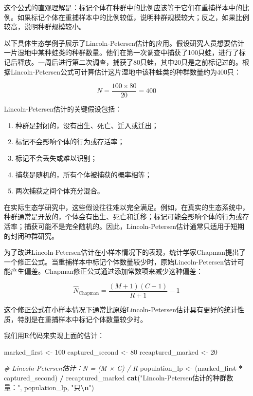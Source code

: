 \documentclass[
  twoside,12pt,fontset=none]{ctexbook}
\newenvironment{Shaded}{\begin{snugshade}}{\end{snugshade}}
\newcommand{\CommentTok}[1]{\textcolor[rgb]{0.56,0.35,0.01}{\textit{#1}}}
\newcommand{\DecValTok}[1]{\textcolor[rgb]{0.00,0.00,0.81}{#1}}
\newcommand{\FunctionTok}[1]{\textcolor[rgb]{0.13,0.29,0.53}{\textbf{#1}}}
\newcommand{\NormalTok}[1]{#1}
\newcommand{\OtherTok}[1]{\textcolor[rgb]{0.56,0.35,0.01}{#1}}
\newcommand{\SpecialCharTok}[1]{\textcolor[rgb]{0.81,0.36,0.00}{\textbf{#1}}}
\newcommand{\StringTok}[1]{\textcolor[rgb]{0.31,0.60,0.02}{#1}}
\providecommand{\tightlist}{%
  \setlength{\itemsep}{0pt}\setlength{\parskip}{0pt}}
\begin{document}
这个公式的直观理解是：标记个体在种群中的比例应该等于它们在重捕样本中的比例。如果标记个体在重捕样本中的比例较低，说明种群规模较大；反之，如果比例较高，说明种群规模较小。

以下具体生态学例子展示了Lincoln-Petersen估计的应用。假设研究人员想要估计一片湿地中某种蛙类的种群数量。他们在第一次调查中捕获了100只蛙，进行了标记后释放。一周后进行第二次调查，捕获了80只蛙，其中20只是之前标记过的。根据Lincoln-Petersen公式可计算估计这片湿地中该种蛙类的种群数量约为400只：

\[N = \frac{100 \times 80}{20} = 400\]

Lincoln-Petersen估计的关键假设包括：

\begin{enumerate}
\def\labelenumi{\arabic{enumi}.}
\tightlist
\item
  种群是封闭的，没有出生、死亡、迁入或迁出；
\item
  标记不会影响个体的行为或存活率；
\item
  标记不会丢失或难以识别；
\item
  捕获是随机的，所有个体被捕获的概率相等；
\item
  两次捕获之间个体充分混合。
\end{enumerate}

在实际生态学研究中，这些假设往往难以完全满足。例如，在真实的生态系统中，种群通常是开放的，个体会有出生、死亡和迁移；标记可能会影响个体的行为或存活率；捕获可能不是完全随机的。因此，Lincoln-Petersen估计通常只适用于短期的封闭种群研究。

为了改进Lincoln-Petersen估计在小样本情况下的表现，统计学家Chapman提出了一个修正公式。当重捕样本中标记个体数量较少时，原始Lincoln-Petersen估计可能产生偏差。Chapman修正公式通过添加常数项来减少这种偏差：

\[\hat{N}_{\text{Chapman}} = \frac{(M+1)(C+1)}{R+1} - 1\]

这个修正公式在小样本情况下通常比原始Lincoln-Petersen估计具有更好的统计性质，特别是在重捕样本中标记个体数量较少时。

我们用R代码来实现上面的估计：

\begin{Shaded}
\begin{Highlighting}[]
\NormalTok{marked\_first }\OtherTok{\textless{}{-}} \DecValTok{100}
\NormalTok{captured\_second }\OtherTok{\textless{}{-}} \DecValTok{80}
\NormalTok{recaptured\_marked }\OtherTok{\textless{}{-}} \DecValTok{20}

\CommentTok{\# Lincoln{-}Petersen估计：N = (M × C) / R}
\NormalTok{population\_lp }\OtherTok{\textless{}{-}}\NormalTok{ (marked\_first }\SpecialCharTok{*}\NormalTok{ captured\_second) }\SpecialCharTok{/}\NormalTok{ recaptured\_marked}
\FunctionTok{cat}\NormalTok{(}\StringTok{"Lincoln{-}Petersen估计的种群数量："}\NormalTok{, population\_lp, }\StringTok{"只}\SpecialCharTok{\textbackslash{}n}\StringTok{"}\NormalTok{)}
\end{Highlighting}
\end{Shaded}
\end{document}

